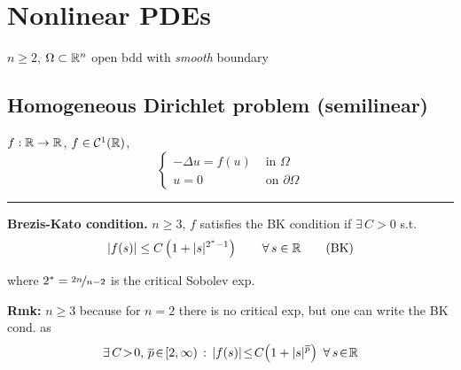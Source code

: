 

\vspace{-1em}

\section{\texorpdfstring{\color{forestgreen(web)}Nonlinear PDEs}{}}


$n\geq 2$, $\Omega\subset\mathbb{R}^n$ open bdd with \emph{smooth} boundary


\subsection{\texorpdfstring{\color{red}Homogeneous Dirichlet problem (semilinear)}{}}


$f:\mathbb{R}\to\mathbb{R}$, $f\in\mathcal{C}^1(\mathbb{R})$,
\begin{equation*}
\begin{cases}
    -\Delta u = f(u) &\text{ in }\Omega\\
    u=0 &\text{ on }\partial\Omega    
\end{cases}
\end{equation*}

\rule{0.31\textwidth}{0.2pt}
\smallskip

\textbf{Brezis-Kato condition.} $n\geq 3$, $f$ satisfies the BK condition if $\exists\, C>0$ s.t.
\begin{equation*}
\left| f(s) \right|\leq C\left( 1+|s|^{2^*-1} \right)\qquad \forall\, s\in\mathbb{R} \tag{BK}
\end{equation*}

where $2^*=\nicefrac{2n}{n-2}$ is the critical Sobolev exp. 

\smallskip

\textbf{Rmk:} $n\geq 3$ because for $n=2$ there is no critical exp, but one can write the BK cond. as
\begin{equation*}
\exists\, C\!>\!0,\,\overline{p}\!\in\![2,\infty)\, :\, \left| f(s) \right|\!\leq\! C\!\left( 1+|s|^{\overline{p}} \right)\ \forall\, s\!\in\!\RR
\end{equation*} 

